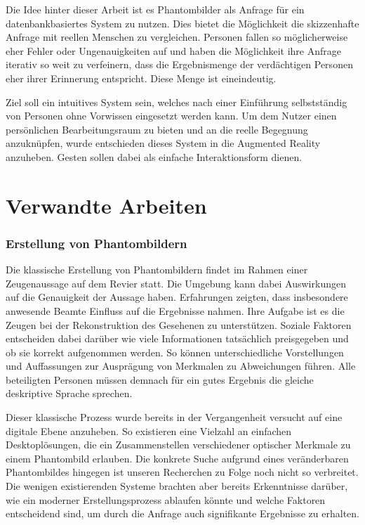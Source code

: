 \documentclass{sigchi-ext}
\begin{document}
Die Idee hinter dieser Arbeit ist es Phantombilder als Anfrage für ein datenbankbasiertes System zu nutzen. Dies bietet die Möglichkeit die skizzenhafte Anfrage mit reellen Menschen zu vergleichen. Personen fallen so möglicherweise eher Fehler oder Ungenauigkeiten auf und haben die Möglichkeit ihre Anfrage iterativ so weit zu verfeinern, dass die Ergebnismenge der verdächtigen Personen eher ihrer Erinnerung entspricht. Diese Menge ist eineindeutig.

Ziel soll ein intuitives System sein, welches nach einer Einführung selbstständig von Personen ohne Vorwissen eingesetzt werden kann. Um dem Nutzer einen persönlichen Bearbeitungsraum zu bieten und an die reelle Begegnung anzuknüpfen, wurde entschieden dieses System in die Augmented Reality anzuheben. Gesten sollen dabei als einfache Interaktionsform dienen.

\section{Verwandte Arbeiten}
\subsubsection{Erstellung von Phantombildern}
Die klassische Erstellung von Phantombildern findet im Rahmen einer Zeugenaussage auf dem Revier statt. Die Umgebung kann dabei Auswirkungen auf die Genauigkeit der Aussage haben. Erfahrungen zeigten, dass insbesondere anwesende Beamte Einfluss auf die Ergebnisse nahmen. Ihre Aufgabe ist es die Zeugen bei der Rekonstruktion des Gesehenen zu unterstützen. Soziale Faktoren entscheiden dabei darüber wie viele Informationen tatsächlich preisgegeben und ob sie korrekt aufgenommen werden. So können unterschiedliche Vorstellungen und Auffassungen zur Ausprägung von Merkmalen zu Abweichungen führen. Alle beteiligten Personen müssen demnach für ein gutes Ergebnis die gleiche deskriptive Sprache sprechen. ~\cite{buchholz:stimme}

Dieser klassische Prozess wurde bereits in der Vergangenheit versucht auf eine digitale Ebene anzuheben. So existieren eine Vielzahl an einfachen Desktoplösungen, die ein Zusammenstellen verschiedener optischer Merkmale zu einem Phantombild erlauben.
Die konkrete Suche aufgrund eines veränderbaren Phantombildes hingegen ist unseren Recherchen zu Folge noch nicht so verbreitet. Die wenigen existierenden Systeme brachten aber bereits Erkenntnisse darüber, wie ein moderner Erstellungsprozess ablaufen könnte und welche Faktoren entscheidend sind, um durch die Anfrage auch signifikante Ergebnisse zu erhalten.
\end{document}
